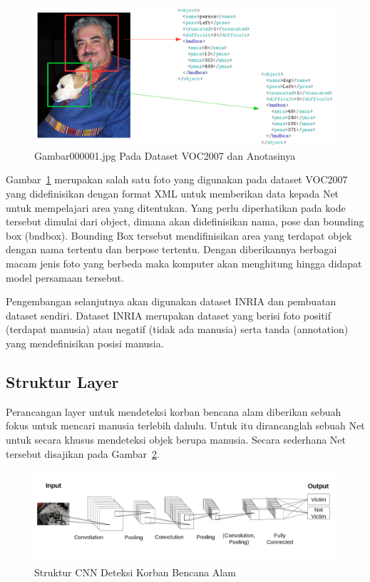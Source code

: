 \begin{figure}[ht]
 \centering
 \includegraphics[width=\textwidth]{voc2007}
 \caption{Gambar000001.jpg Pada Dataset VOC2007 dan Anotasinya }
 \label{fig:voc2007}   
\end{figure}  

Gambar~\ref{fig:voc2007} merupakan salah satu foto yang digunakan pada dataset VOC2007 yang didefinisikan dengan format XML untuk memberikan data kepada Net untuk mempelajari area yang ditentukan. Yang perlu diperhatikan pada kode tersebut dimulai dari object, dimana akan didefinisikan nama, pose dan bounding box (bndbox). Bounding Box tersebut mendifinisikan area yang terdapat objek dengan nama tertentu dan berpose tertentu. Dengan diberikannya berbagai macam jenis foto yang berbeda maka komputer akan menghitung hingga didapat model persamaan tersebut.

Pengembangan selanjutnya akan digunakan dataset INRIA \cite{dalal2005histograms} dan pembuatan dataset sendiri. Dataset INRIA merupakan dataset yang berisi foto positif (terdapat manusia) atau negatif (tidak ada manusia) serta tanda (annotation) yang mendefinisikan posisi manusia.

\subsection{ Struktur Layer}
Perancangan layer untuk mendeteksi korban bencana alam diberikan sebuah fokus untuk mencari manusia terlebih dahulu. Untuk itu dirancanglah sebuah Net untuk secara khusus mendeteksi objek berupa manusia. Secara sederhana Net tersebut disajikan pada Gambar~\ref{fig:strukturcnn}.

\begin{figure}[ht]
  \centering
  \includegraphics[width=\textwidth]{strukturcnn}
  \caption{Struktur CNN Deteksi Korban Bencana Alam}
  \label{fig:strukturcnn}
\end{figure}

